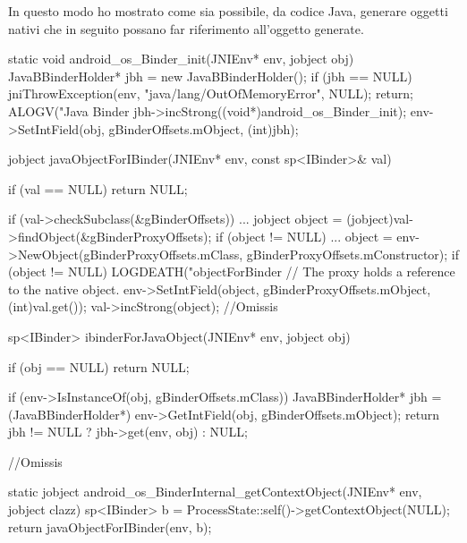 In questo modo ho mostrato come sia possibile, da codice Java, generare oggetti
nativi che in seguito possano far riferimento all'oggetto generate.

\begin{algorithm}[p]
\begin{cpp}[ caption=$ $ Alcune funzioni JNI in \texttt{\small android\_util\_Binder.cpp},label=lst:androidutilbind]
static void android_os_Binder_init(JNIEnv* env, jobject obj)
{
    JavaBBinderHolder* jbh = new JavaBBinderHolder();
    if (jbh == NULL) {
        jniThrowException(env, "java/lang/OutOfMemoryError", NULL);
        return;
    }
    ALOGV("Java Binder %
    jbh->incStrong((void*)android_os_Binder_init);
    env->SetIntField(obj, gBinderOffsets.mObject, (int)jbh);
}

jobject javaObjectForIBinder(JNIEnv* env, const sp<IBinder>& val)
{
    if (val == NULL) return NULL;

    if (val->checkSubclass(&gBinderOffsets)) { ... }
    jobject object = (jobject)val->findObject(&gBinderProxyOffsets);
    if (object != NULL) { ... }
    object = env->NewObject(gBinderProxyOffsets.mClass, gBinderProxyOffsets.mConstructor);
    if (object != NULL) {
        LOGDEATH("objectForBinder %
        // The proxy holds a reference to the native object.
        env->SetIntField(object, gBinderProxyOffsets.mObject, (int)val.get());
        val->incStrong(object);
        //Omissis
    }
}

sp<IBinder> ibinderForJavaObject(JNIEnv* env, jobject obj)
{
    if (obj == NULL) return NULL;

    if (env->IsInstanceOf(obj, gBinderOffsets.mClass)) {
        JavaBBinderHolder* jbh = (JavaBBinderHolder*)
            env->GetIntField(obj, gBinderOffsets.mObject);
        return jbh != NULL ? jbh->get(env, obj) : NULL;
    }

    //Omissis
}

static jobject android_os_BinderInternal_getContextObject(JNIEnv* env, jobject clazz)
{
    sp<IBinder> b = ProcessState::self()->getContextObject(NULL);
    return javaObjectForIBinder(env, b);
}
\end{cpp}
\end{algorithm}

